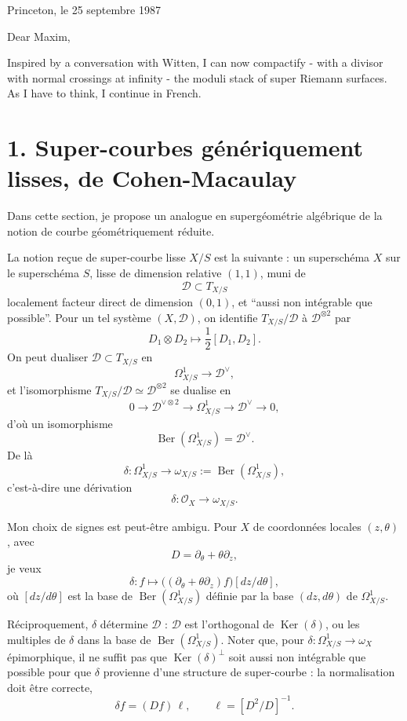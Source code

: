 \documentclass[11pt]{article}
\newcommand{\cO}{\mathcal O}
\newcommand{\cD}{\mathcal D}
\newcommand{\Ber}{\operatorname{Ber}}
\newcommand{\Ker}{\operatorname{Ker}}
\begin{document}
\begin{flushright}
Princeton, le 25 septembre 1987
\end{flushright}

Dear Maxim,

Inspired by a conversation with Witten, I can now compactify - with a divisor with normal crossings at infinity - the moduli stack of super Riemann surfaces. As I have to think, I continue in French.

\section*{1. Super-courbes génériquement lisses, de Cohen-Macaulay}

Dans cette section, je propose un analogue en supergéométrie algébrique de la notion de courbe géométriquement réduite.

La notion reçue de super-courbe lisse $X/S$ est la suivante : un superschéma $X$ sur le superschéma $S$, lisse de dimension relative $(1,1)$, muni de
\[
  \cD \subset T_{X/S}
\]
localement facteur direct de dimension $(0,1)$, et ``aussi non intégrable que possible''. Pour un tel système $(X,\cD)$, on identifie $T_{X/S}/\cD$ à $\cD^{\otimes 2}$ par
\[
  D_1\otimes D_2 \longmapsto \frac12 [D_1,D_2].
\]
On peut dualiser $\cD\subset T_{X/S}$ en
\begin{equation}\tag{1.1}
  \Omega^1_{X/S}\longrightarrow \cD^\vee,
\end{equation}
et l'isomorphisme $T_{X/S}/\cD\simeq \cD^{\otimes 2}$ se dualise en
\[
  0\longrightarrow \cD^{\vee\otimes 2}
    \longrightarrow \Omega^1_{X/S}
    \longrightarrow \cD^\vee\longrightarrow 0,
\]
d'où un isomorphisme
\[
  \Ber(\Omega^1_{X/S})=\cD^\vee.
\]
De là
\begin{equation}\tag{1.2}
  \delta:\Omega^1_{X/S}\longrightarrow \omega_{X/S}:=\Ber(\Omega^1_{X/S}),
\end{equation}
c'est-à-dire une dérivation
\[
  \delta:\cO_X\longrightarrow \omega_{X/S}.
\]

Mon choix de signes est peut-être ambigu. Pour $X$ de coordonnées locales $(z,\theta)$, avec
\[
  D=\partial_\theta+\theta\partial_z,
\]
je veux
\[
  \delta:f\longmapsto \bigl((\partial_\theta+\theta\partial_z)f\bigr)[dz/d\theta],
\]
où $[dz/d\theta]$ est la base de $\Ber(\Omega^1_{X/S})$ définie par la base $(dz,d\theta)$ de $\Omega^1_{X/S}$.

Réciproquement, $\delta$ détermine $\cD$ : $\cD$ est l'orthogonal de $\Ker(\delta)$, ou les multiples de $\delta$ dans la base de $\Ber(\Omega^1_{X/S})$. Noter que, pour $\delta:\Omega^1_{X/S}\to \omega_X$ épimorphique, il ne suffit pas que $\Ker(\delta)^{\perp}$ soit aussi non intégrable que possible pour que $\delta$ provienne d'une structure de super-courbe : la normalisation doit être correcte,
\[
  \delta f=(Df)\,\ell,
  \qquad \ell=[D^2/D]^{-1}.
\]
\end{document}
